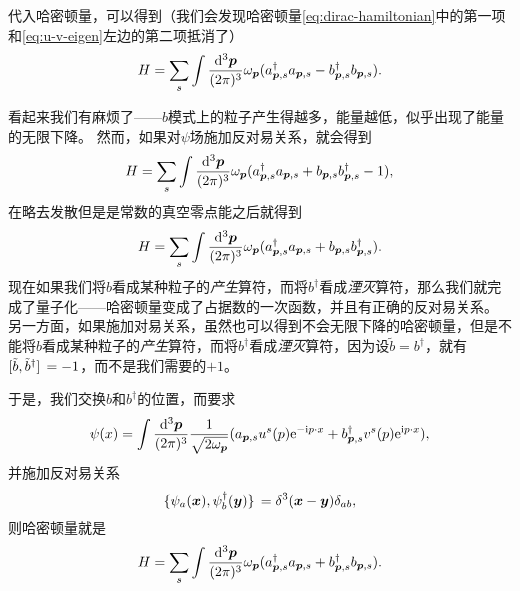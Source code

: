 代入哈密顿量，可以得到（我们会发现哈密顿量\eqref{eq:dirac-hamiltonian}中的第一项和\eqref{eq:u-v-eigen}左边的第二项抵消了）
\[
    H = \sum_{s} \int \frac{\dd[3]{\vb*{p}}}{(2\pi)^3} \omega_{\vb*{p}} (a^\dagger_{\vb*{p}, s} a_{\vb*{p}, s} - b^\dagger_{\vb*{p}, s} b_{\vb*{p}, s}).
\]

看起来我们有麻烦了——$b$模式上的粒子产生得越多，能量越低，似乎出现了能量的无限下降。
然而，如果对$\psi$场施加反对易关系，就会得到
\[
    H = \sum_{s} \int \frac{\dd[3]{\vb*{p}}}{(2\pi)^3} \omega_{\vb*{p}} (a^\dagger_{\vb*{p}, s} a_{\vb*{p}, s} + b_{\vb*{p}, s} b^\dagger_{\vb*{p}, s} - 1),
\]
在略去发散但是是常数的真空零点能之后就得到
\begin{equation}
    H = \sum_{s} \int \frac{\dd[3]{\vb*{p}}}{(2\pi)^3} \omega_{\vb*{p}} (a^\dagger_{\vb*{p}, s} a_{\vb*{p}, s} + b_{\vb*{p}, s} b^\dagger_{\vb*{p}, s} ).
\end{equation}
现在如果我们将$b$看成某种粒子的\emph{产生}算符，而将$b^\dagger$看成\emph{湮灭}算符，那么我们就完成了量子化——哈密顿量变成了占据数的一次函数，并且有正确的反对易关系。
另一方面，如果施加对易关系，虽然也可以得到不会无限下降的哈密顿量，但是不能将$b$看成某种粒子的\emph{产生}算符，而将$b^\dagger$看成\emph{湮灭}算符，因为设$\tilde{b} = b^\dagger$，就有$\comm*{\tilde{b}}{\tilde{b}^\dagger} = -1$，而不是我们需要的$+1$。

于是，我们交换$b$和$b^\dagger$的位置，而要求
\begin{equation}
    \psi(x) = \int \frac{\dd[3]{\vb*{p}}}{(2\pi)^3} \frac{1}{\sqrt{2 \omega_{\vb*{p}}}} (a_{\vb*{p}, s} u^s(p) \mathrm{e}^{-\mathrm{i} p \cdot x} + b^\dagger_{\vb*{p}, s} v^s(p) \mathrm{e}^{\mathrm{i} p \cdot x}),
\end{equation}
并施加反对易关系
\begin{equation}
    \acomm*{\psi_a(\vb*{x})}{\psi^\dagger_b(\vb*{y})} = \delta^3(\vb*{x} - \vb*{y}) \delta_{ab},
\end{equation}
则哈密顿量就是
\begin{equation}
    H = \sum_{s} \int \frac{\dd[3]{\vb*{p}}}{(2\pi)^3} \omega_{\vb*{p}} (a^\dagger_{\vb*{p}, s} a_{\vb*{p}, s} + b^\dagger_{\vb*{p}, s} b_{\vb*{p}, s} ).
\end{equation}

